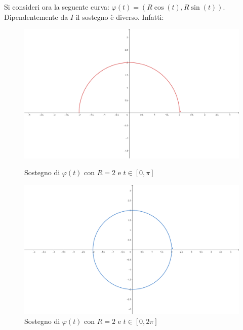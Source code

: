 \begin{example}
    Si consideri ora la seguente curva: $\varphi(t)=(R \cos(t), R \sin(t))$. Dipendentemente da $I$ il sostegno è diverso. Infatti:
\begin{figure}[H]
    \centering
    \begin{minipage}{0.25\textwidth}
        \centering
        \includegraphics[width=\textwidth]{Capitoli/Capitolo1/sostegno_circ1.png}
        \caption{Sostegno di $\varphi(t)$ con $R=2$ e $t\in[0, \pi]$}
    \end{minipage}
    \hspace{1cm}
    \begin{minipage}{0.25\textwidth}
        \centering
        \includegraphics[width=\textwidth]{Capitoli/Capitolo1/sostegno_circ2.png}
        \caption{Sostegno di $\varphi(t)$ con $R=2$ e $t\in[0, 2\pi]$}
    \end{minipage}
    \hspace{1cm}
    \begin{minipage}{0.25\textwidth}
        \centering

\end{minipage}
\end{figure}
\end{example}
